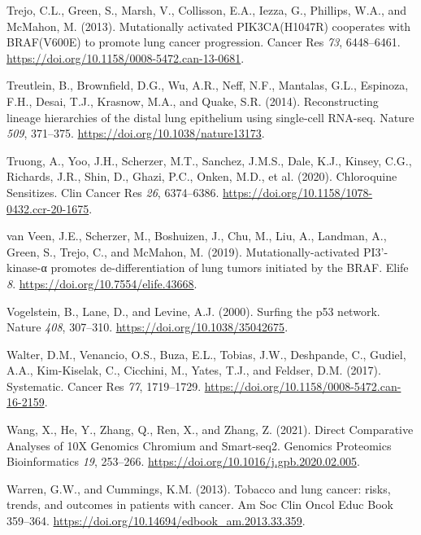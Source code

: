 \begin{CSLReferences}{0}{0}
\leavevmode{}%
Trejo, C.L., Green, S., Marsh, V., Collisson, E.A., Iezza, G., Phillips, W.A., and McMahon, M. (2013). Mutationally activated PIK3CA(H1047R) cooperates with BRAF(V600E) to promote lung cancer progression. Cancer Res \emph{73}, 6448--6461. \url{https://doi.org/10.1158/0008-5472.can-13-0681}.

\leavevmode{}%
Treutlein, B., Brownfield, D.G., Wu, A.R., Neff, N.F., Mantalas, G.L., Espinoza, F.H., Desai, T.J., Krasnow, M.A., and Quake, S.R. (2014). Reconstructing lineage hierarchies of the distal lung epithelium using single-cell RNA-seq. Nature \emph{509}, 371--375. \url{https://doi.org/10.1038/nature13173}.

\leavevmode{}%
Truong, A., Yoo, J.H., Scherzer, M.T., Sanchez, J.M.S., Dale, K.J., Kinsey, C.G., Richards, J.R., Shin, D., Ghazi, P.C., Onken, M.D., et al. (2020). Chloroquine Sensitizes. Clin Cancer Res \emph{26}, 6374--6386. \url{https://doi.org/10.1158/1078-0432.ccr-20-1675}.

\leavevmode{}%
van Veen, J.E., Scherzer, M., Boshuizen, J., Chu, M., Liu, A., Landman, A., Green, S., Trejo, C., and McMahon, M. (2019). Mutationally-activated PI3'-kinase-α promotes de-differentiation of lung tumors initiated by the BRAF. Elife \emph{8}. \url{https://doi.org/10.7554/elife.43668}.

\leavevmode{}%
Vogelstein, B., Lane, D., and Levine, A.J. (2000). Surfing the p53 network. Nature \emph{408}, 307--310. \url{https://doi.org/10.1038/35042675}.

\leavevmode{}%
Walter, D.M., Venancio, O.S., Buza, E.L., Tobias, J.W., Deshpande, C., Gudiel, A.A., Kim-Kiselak, C., Cicchini, M., Yates, T.J., and Feldser, D.M. (2017). Systematic. Cancer Res \emph{77}, 1719--1729. \url{https://doi.org/10.1158/0008-5472.can-16-2159}.

\leavevmode{}%
Wang, X., He, Y., Zhang, Q., Ren, X., and Zhang, Z. (2021). Direct Comparative Analyses of 10X Genomics Chromium and Smart-seq2. Genomics Proteomics Bioinformatics \emph{19}, 253--266. \url{https://doi.org/10.1016/j.gpb.2020.02.005}.

\leavevmode{}%
Warren, G.W., and Cummings, K.M. (2013). Tobacco and lung cancer: risks, trends, and outcomes in patients with cancer. Am Soc Clin Oncol Educ Book 359--364. \url{https://doi.org/10.14694/edbook_am.2013.33.359}.


\end{CSLReferences}
